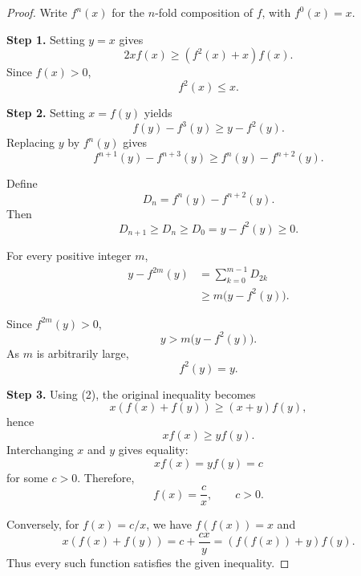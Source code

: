 
\begin{dlsummary}[title={\bfseries Solution 14. IMO 2023 Shortlist -- Algebra A4},breakable]

\begin{proof}
Write $f^n(x)$ for the $n$-fold composition
of $f$, with $f^0(x)=x$.

\medskip
\noindent\textbf{Step 1.}
Setting $y=x$ gives
\[
2xf(x)\ge(f^2(x)+x)f(x).
\]
Since $f(x)>0$,
\[
\boxed{f^2(x)\le x.} \tag{1}
\]

\medskip
\noindent\textbf{Step 2.}
Setting $x=f(y)$ yields
\[
f(y)-f^3(y)\ge y-f^2(y).
\]
Replacing $y$ by $f^n(y)$ gives
\[
f^{n+1}(y)-f^{n+3}(y)
\ge f^n(y)-f^{n+2}(y).
\]

Define
\[
D_n=f^n(y)-f^{n+2}(y).
\]
Then
\[
D_{n+1}\ge D_n\ge D_0
=y-f^2(y)\ge0.
\]

For every positive integer $m$,
\begin{align*}
y-f^{2m}(y)
&=\sum_{k=0}^{m-1}D_{2k}\\
&\ge m\bigl(y-f^2(y)\bigr).
\end{align*}

Since $f^{2m}(y)>0$,
\[
y>m\bigl(y-f^2(y)\bigr).
\]
As $m$ is arbitrarily large,
\[
\boxed{f^2(y)=y.} \tag{2}
\]

\medskip
\noindent\textbf{Step 3.}
Using (2), the original inequality becomes
\[
x(f(x)+f(y))\ge(x+y)f(y),
\]
hence
\[
xf(x)\ge yf(y).
\]
Interchanging $x$ and $y$ gives equality:
\[
xf(x)=yf(y)=c
\]
for some $c>0$. Therefore,
\[
\boxed{f(x)=\frac{c}{x},\qquad c>0.}
\]

Conversely, for $f(x)=c/x$,
we have $f(f(x))=x$ and
\[
x(f(x)+f(y))
=c+\frac{cx}{y}
=(f(f(x))+y)f(y).
\]
Thus every such function satisfies the
given inequality.
\end{proof}

\end{dlsummary}